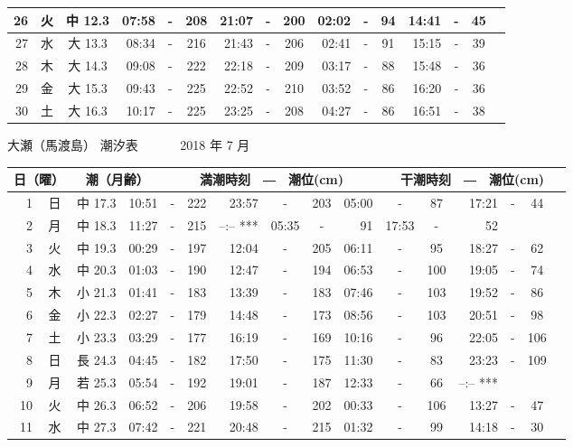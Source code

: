 \documentclass[12pt.a4j]{jsarticle}
\begin{document}
\begin{center}
\begin{table}[ht]
\begin{tabular}{|rc|cr|ccrccr|ccrccr|}
\hline
26 & 火 & 中 12.3 & 07:58 &-& 208 & 21:07 &-& 200 & 02:02 &-&  94 & 14:41 &-&  45 \\
\hline
27 & 水 & 大 13.3 & 08:34 &-& 216 & 21:43 &-& 206 & 02:41 &-&  91 & 15:15 &-&  39 \\
\hline
28 & 木 & 大 14.3 & 09:08 &-& 222 & 22:18 &-& 209 & 03:17 &-&  88 & 15:48 &-&  36 \\
\hline
29 & 金 & 大 15.3 & 09:43 &-& 225 & 22:52 &-& 210 & 03:52 &-&  86 & 16:20 &-&  36 \\
\hline
30 & 土 & 大 16.3 & 10:17 &-& 225 & 23:25 &-& 208 & 04:27 &-&  86 & 16:51 &-&  38 \\
\hline
\end{tabular}
\end{table}
\newpage
 {\LARGE 大瀬（馬渡島）  潮汐表　　　}
 {\large 2018 年  7 月}\\
 \begin{table}[ht]
 \begin{tabular}{|rc|cr|ccrccr|ccrccr|}
 \hline
 \multicolumn{2}{|c|}{日（曜）} & \multicolumn{2}{c|}{潮（月齢）} & \multicolumn{6}{c|}{満潮時刻　―　潮位(cm)} & \multicolumn{6}{c|}{干潮時刻　―　潮位(cm)} \\
 \hline
 1 & 日 & 中 17.3 & 10:51 &-& 222 & 23:57 &-& 203 & 05:00 &-&  87 & 17:21 &-&  44 \\
\hline
 2 & 月 & 中 18.3 & 11:27 &-& 215 & --:--   *** & 05:35 &-&  91 & 17:53 &-&  52 \\
\hline
 3 & 火 & 中 19.3 & 00:29 &-& 197 & 12:04 &-& 205 & 06:11 &-&  95 & 18:27 &-&  62 \\
\hline
 4 & 水 & 中 20.3 & 01:03 &-& 190 & 12:47 &-& 194 & 06:53 &-& 100 & 19:05 &-&  74 \\
\hline
 5 & 木 & 小 21.3 & 01:41 &-& 183 & 13:39 &-& 183 & 07:46 &-& 103 & 19:52 &-&  86 \\
\hline
 6 & 金 & 小 22.3 & 02:27 &-& 179 & 14:48 &-& 173 & 08:56 &-& 103 & 20:51 &-&  98 \\
\hline
 7 & 土 & 小 23.3 & 03:29 &-& 177 & 16:19 &-& 169 & 10:16 &-&  96 & 22:05 &-& 106 \\
\hline
 8 & 日 & 長 24.3 & 04:45 &-& 182 & 17:50 &-& 175 & 11:30 &-&  83 & 23:23 &-& 109 \\
\hline
 9 & 月 & 若 25.3 & 05:54 &-& 192 & 19:01 &-& 187 & 12:33 &-&  66 & --:--   *** \\
\hline
10 & 火 & 中 26.3 & 06:52 &-& 206 & 19:58 &-& 202 & 00:33 &-& 106 & 13:27 &-&  47 \\
\hline
11 & 水 & 中 27.3 & 07:42 &-& 221 & 20:48 &-& 215 & 01:32 &-&  99 & 14:18 &-&  30 \\

\end{tabular}
\end{table}
\end{center}
\end{document}
